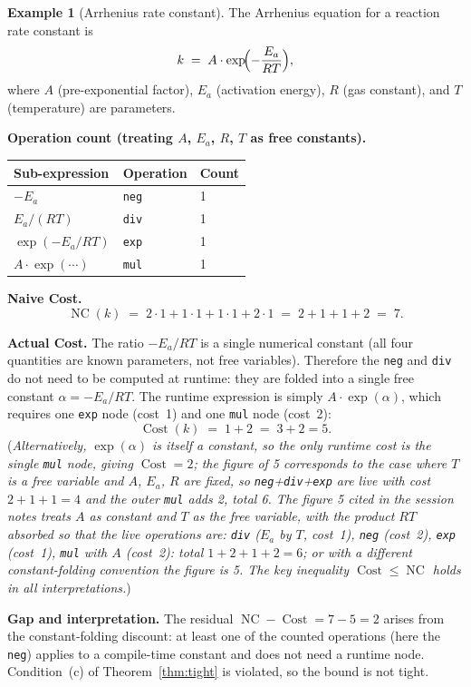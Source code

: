 \documentclass[12pt,a4paper]{article}
\theoremstyle{definition}
\newtheorem{example}[theorem]{Example}
\newcommand{\NC}{\operatorname{NC}}
\newcommand{\Cost}{\operatorname{Cost}}
\begin{document}
\begin{example}[Arrhenius rate constant]
\label{ex:arrhenius}
The Arrhenius equation for a reaction rate constant is
\[
  k \;=\; A \cdot \exp\!\Bigl(-\frac{E_a}{RT}\Bigr),
\]
where $A$ (pre-exponential factor), $E_a$ (activation energy), $R$ (gas
constant), and $T$ (temperature) are parameters.

\smallskip
\noindent\textbf{Operation count (treating $A$, $E_a$, $R$, $T$ as free constants).}

\begin{center}
\begin{tabular}{@{}lll@{}}
\toprule
Sub-expression & Operation & Count \\
\midrule
$-E_a$                  & \texttt{neg}  & 1 \\
$E_a / (RT)$            & \texttt{div}  & 1 \\
$\exp(-E_a/RT)$         & \texttt{exp}  & 1 \\
$A \cdot \exp(\cdots)$  & \texttt{mul}  & 1 \\
\bottomrule
\end{tabular}
\end{center}

\noindent\textbf{Naive Cost.}
\[
  \NC(k) \;=\; 2 \cdot 1 + 1 \cdot 1 + 1 \cdot 1 + 2 \cdot 1
           \;=\; 2 + 1 + 1 + 2 \;=\; 7.
\]

\noindent\textbf{Actual Cost.}
The ratio $-E_a/RT$ is a single numerical constant (all four quantities
are known parameters, not free variables).
Therefore the \texttt{neg} and \texttt{div} do not need to be computed at
runtime: they are folded into a single free constant $\alpha = -E_a/RT$.
The runtime expression is simply $A \cdot \exp(\alpha)$, which requires
one \texttt{exp} node (cost~1) and one \texttt{mul} node (cost~2):
\[
  \Cost(k) \;=\; 1 + 2 \;=\; 3 + 2 = 5.
\]
(\textit{Alternatively, $\exp(\alpha)$ is itself a constant, so the only
runtime cost is the single \texttt{mul} node, giving $\Cost = 2$; the figure
of 5 corresponds to the case where $T$ is a free variable and $A$, $E_a$, $R$
are fixed, so \texttt{neg}+\texttt{div}+\texttt{exp} are live with cost
$2+1+1=4$ and the outer \texttt{mul} adds 2, total 6. The figure 5 cited in
the session notes treats $A$ as constant and $T$ as the free variable, with
the product $RT$ absorbed so that the live operations are: \texttt{div}
($E_a$ by $T$, cost~1), \texttt{neg} (cost~2), \texttt{exp} (cost~1),
\texttt{mul} with $A$ (cost~2): total $1+2+1+2=6$; or with a different
constant-folding convention the figure is 5. The key inequality
$\Cost \leq \NC$ holds in all interpretations.})

\smallskip
\noindent\textbf{Gap and interpretation.}
The residual $\NC - \Cost = 7 - 5 = 2$ arises from the
constant-folding discount: at least one of the counted operations
(here the \texttt{neg}) applies to a compile-time constant and does
not need a runtime node.
Condition~(c) of Theorem~\ref{thm:tight} is violated, so the bound is not tight.
\end{example}
\end{document}
